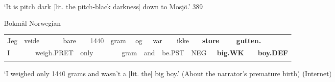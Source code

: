 \begin{styleTranslation}
‘It is pitch dark [lit. the pitch-black darkness] down to Mosjö.’ 389

\end{styleTranslation}

\begin{listWWNumileveli}
\item 

\begin{styleExample}
Bokmål Norwegian

\end{styleExample}

\end{listWWNumileveli}

\begin{tabular}{llllllllllllllllllll}
\lsptoprule
Jeg & \multicolumn{2}{l}{veide

} & \multicolumn{2}{l}{bare

} & \multicolumn{2}{l}{1440

} & \multicolumn{2}{l}{gram

} & \multicolumn{2}{l}{og

} & \multicolumn{2}{l}{var

} & \multicolumn{2}{l}{ikke

} & \multicolumn{2}{l}{{\bfseries store}

} & \multicolumn{2}{l}{{\bfseries gutten.}

} & \\
\multicolumn{2}{l}{I

} & \multicolumn{2}{l}{weigh.PRET

} & \multicolumn{2}{l}{only

} & \multicolumn{2}{l}{} & \multicolumn{2}{l}{gram

} & \multicolumn{2}{l}{and

} & \multicolumn{2}{l}{be.PST

} & \multicolumn{2}{l}{NEG

} & \multicolumn{2}{l}{{\bfseries big.WK}

} & \multicolumn{2}{l}{{\bfseries boy.DEF}

}\\
\lspbottomrule
\end{tabular}

\begin{styleTranslation}
‘I weighed only 1440 grams and wasn’t a [lit. the] big boy.’ (About the narrator’s premature birth) (Internet) 

\end{styleTranslation}

